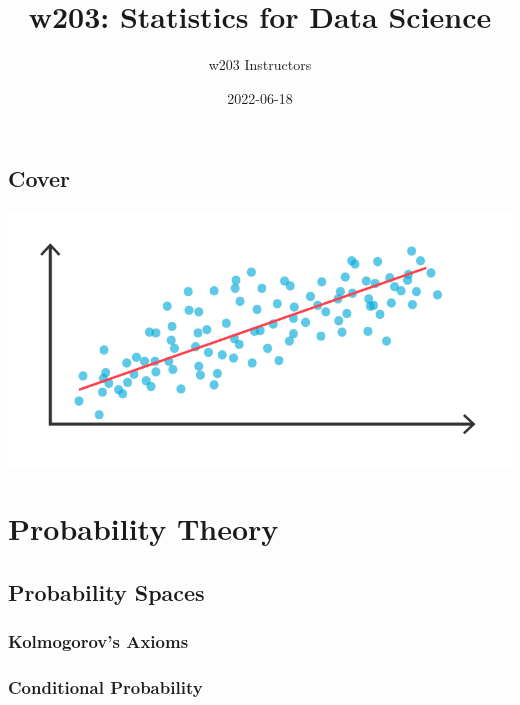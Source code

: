 \documentclass[
]{book}
\title{w203: Statistics for Data Science}
\author{w203 Instructors}
\date{2022-06-18}
\theoremstyle{definition}
\theoremstyle{definition}
\theoremstyle{definition}
\theoremstyle{definition}
\theoremstyle{remark}
\begin{document}
\maketitle

{
\hypersetup{linkcolor=}
\setcounter{tocdepth}{1}
\tableofcontents
}
\newcommand{\E}[1]{{\mathbb{E}\left[ #1 \right]}}
\newcommand{\V}[1]{{\mathbb{V}\left[ #1 \right]}}
\renewcommand{\C}[1]{{\text{Cov}\left[ #1 \right]}}
\renewcommand{\v}[1]{{\boldsymbol{#1}}}
\newcommand{\m}[1]{{\mathbb{#1}}}
\newcommand{\p}[1]{{\mathbb{P}\left(#1\right)}}
\newcommand{\eps}{\varepsilon}

\hypertarget{cover}{%
\chapter*{Cover}\label{cover}}

\includegraphics[width=0.85\linewidth]{./images/cover}

\hypertarget{part-probability-theory}{%
\part{Probability Theory}\label{part-probability-theory}}

\hypertarget{probability-spaces}{%
\chapter{Probability Spaces}\label{probability-spaces}}

\hypertarget{kolmogorovs-axioms}{%
\section{Kolmogorov's Axioms}\label{kolmogorovs-axioms}}

\hypertarget{conditional-probability}{%
\section{Conditional Probability}\label{conditional-probability}}
\end{document}
